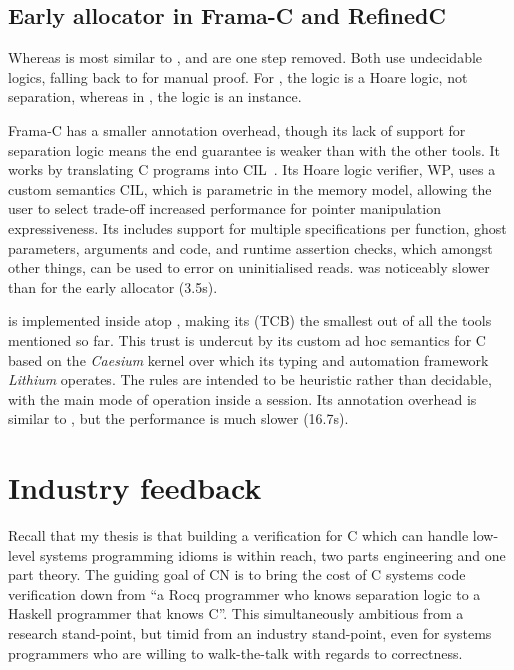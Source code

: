 \subsection{Early allocator in Frama-C and RefinedC}

Whereas  is most similar to ,  and
 are one step removed. Both use undecidable logics, falling back
to  for manual proof. For , the logic is a Hoare logic,
not separation, whereas in , the logic is an  instance.

Frama-C has a smaller annotation overhead, though its lack of support for
separation logic means the end guarantee is weaker than with the other tools.
It works by translating C programs into CIL~. Its Hoare
logic verifier, WP, uses a custom semantics CIL, which is parametric in the
memory model, allowing the user to select trade-off increased performance for
pointer manipulation expressiveness. Its includes support for multiple
specifications per function, ghost parameters, arguments and code, and runtime
assertion checks, which amongst other things, can be used to error on
uninitialised reads.  was noticeably slower than  for the
early allocator (3.5s).

 is implemented inside  atop , making its
 (TCB) the smallest out of all the tools
mentioned so far. This trust is undercut by its custom ad hoc semantics for C
based on the \emph{Caesium} kernel over which its typing and automation
framework \emph{Lithium} operates. The rules are intended to be heuristic
rather than decidable, with the main mode of operation inside a 
session. Its annotation overhead is similar to , but the performance is
much slower (16.7s).

\section{Industry feedback}

Recall that my thesis is that building a verification for C which can handle
low-level systems programming idioms is within reach, two parts engineering and
one part theory. The guiding goal of CN is to bring the cost of C systems code
verification down from ``a Rocq programmer who knows separation logic to a
Haskell programmer that knows C''. This simultaneously ambitious from a
research stand-point, but timid from an industry stand-point, even for systems
programmers who are willing to walk-the-talk with regards to correctness.

